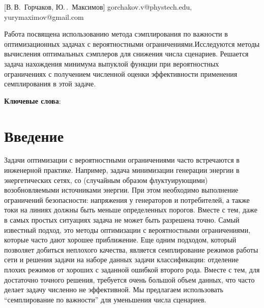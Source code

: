 \documentclass[12pt, twoside]{article}
\begin{document}
\title
    [] %
    {}
\author
    [В.\,В. ~Горчаков] %
    {В.\,В.~Горчаков, Ю.\,.~Максимов} %
    [В.\,В.~Горчаков, Ю.\,.~Максимов] %
\email
   {gorchakov.v@phystech.edu, yurymaximov@gmail.com}
\abstract
  {Работа посвящена использованию метода сэмплирования по важности в оптимизационных задачах с вероятностными ограничениями.Исследуются методы вычисления оптимальных сэмплеров для снижения числа сценариев. Решается задача нахождения минимума выпуклой функции при вероятностных ограничениях  с получением численной оценки эффективности применения семплирования в этой задаче.
  
  

\bigskip
\noindent
\textbf{Ключевые слова}: \emph {}
}

\doi{}
\receivedRus{}
\receivedEng{}

\maketitle
\linenumbers

\section{Введение}


Задачи оптимизации с вероятностными ограничениями часто встречаются в инженерной практике. Например, задача минимизации генерации энергии в энергетических сетях, со (случайным образом флуктуирующими) возобновляемыми источниками энергии. При этом необходимо выполнение ограничений безопасности: напряжения у генераторов и потребителей, а также токи на линиях должны быть меньше определенных порогов. Вместе с тем, даже в самых простых ситуациях задача не может быть разрешена точно. Самый известный подход, это методы оптимизации с вероятностными ограничениями, которые часто дают хорошее приближение. Еще одним подходом, который позволяет добиться неплохого качества, является семплирование режимов работы сети и решения задачи на наборе данных задачи классификации: отделение плохих режимов от хороших с заданной ошибкой второго рода. Вместе с тем, для достаточно точного решения, требуется очень большой объем данных, что часто делает задачу численно не эффективной. Мы предлагаем использовать “семплирование по важности” для уменьшения числа сценариев. 
\end{document}
